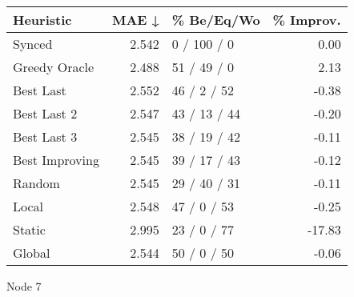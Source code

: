 \begin{tabular}{lrlr}
\toprule
\textbf{Heuristic} & \textbf{MAE ↓} & \textbf{\% Be/Eq/Wo} & \textbf{\% Improv.} \\
\midrule
            Synced &          2.542 &          0 / 100 / 0 &                0.00 \\
     Greedy Oracle &          2.488 &          51 / 49 / 0 &                2.13 \\
         Best Last &          2.552 &          46 / 2 / 52 &               -0.38 \\
       Best Last 2 &          2.547 &         43 / 13 / 44 &               -0.20 \\
       Best Last 3 &          2.545 &         38 / 19 / 42 &               -0.11 \\
    Best Improving &          2.545 &         39 / 17 / 43 &               -0.12 \\
            Random &          2.545 &         29 / 40 / 31 &               -0.11 \\
             Local &          2.548 &          47 / 0 / 53 &               -0.25 \\
            Static &          2.995 &          23 / 0 / 77 &              -17.83 \\
            Global &          2.544 &          50 / 0 / 50 &               -0.06 \\
\bottomrule
\end{tabular}
\caption{Node 7}
\label{tab:hr_iid_lr01_le2_bs2_7}
